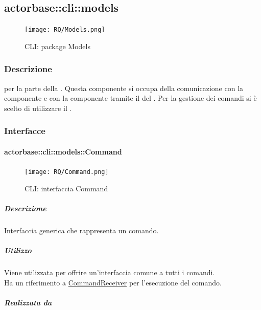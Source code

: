 \documentclass{scalatekids-article}
\begin{document}
\subsection{actorbase::cli::models}
\label{sec:actorbase::cli::models}

\begin{figure}[H]
  \begin{center}
    \texttt{[image: RQ/Models.png]}
    \caption{CLI: package Models}
  \end{center}
\end{figure}

\subsubsection{Descrizione}

 per la parte  della . Questa
componente si occupa della comunicazione con la componente  e
con la componente  tramite il  del  . Per la gestione dei comandi si è scelto di
utilizzare il .

\subsubsection{Interfacce}

\paragraph{actorbase::cli::models::Command}
\label{sec:actorbase::cli::models::Command}

\begin{figure}[H]
  \begin{center}
    \texttt{[image: RQ/Command.png]}
    \caption{CLI: interfaccia Command}
  \end{center}
\end{figure}

\subparagraph{Descrizione}

Interfaccia generica che rappresenta un comando.

\subparagraph{Utilizzo}

Viene utilizzata per offrire un'interfaccia comune a tutti i comandi.\\Ha un
riferimento a \hyperref[sec:actorbase::cli::models::CommandReceiver]{CommandReceiver} per l'esecuzione del
comando.

\subparagraph{Realizzata da}
\end{document}
